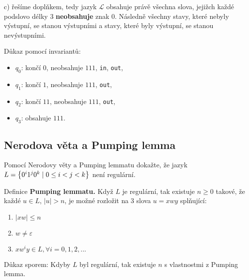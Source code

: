 c) řešíme doplňkem, tedy jazyk $\mathcal{L}$ obsahuje právě všechna slova, jejižch každé podslovo délky $3$ \textbf{neobsahuje}
znak $0$. Následně všechny stavy, které nebyly výstupní, se stanou výstupními a stavy, které byly výstupní, se stanou
nevýstupními.


Důkaz pomocí invariantů:
\begin{itemize}[noitemsep]
    \item $q_0$: končí $0$, neobsahuje $111$, \texttt{in}, \texttt{out},
    \item $q_1$: končí $1$, neobsahuje $111$, \texttt{out},
    \item $q_2$: končí $11$, neobsahuje $111$, \texttt{out},
    \item $q_3$: obsahuje $111$.
\end{itemize}

\newpage

\subsection{Nerodova věta a Pumping lemma}
Pomocí Nerodovy věty a Pumping lemmatu dokažte, že jazyk $L = \left\lbrace 0^i 1^j 0^k \mid 0 \leq i < j <k \right\rbrace$ není regulární.

Definice \textbf{Pumping lemmatu.} Když $L$ je regulární, tak existuje $n \geq 0$ takové, že každé ${u \in L}$,
$|u| > n$, je možné rozložit na 3 slova $u = xwy$ splňující:

\begin{enumerate}[1), noitemsep]
    \item $|xw| \leq n$
    \item $w \not= \varepsilon$
    \item $xw^i y \in L, \forall i = 0, 1, 2, ...$
\end{enumerate}
Důkaz sporem:
Kdyby $L$ byl regulární, tak existuje $n$ s vlastnostmi z Pumping lemma.

